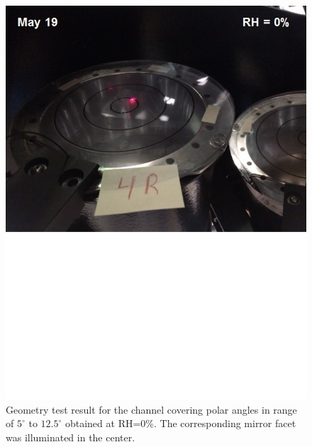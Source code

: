 \begin{figure}[ht]
    \centering
    \includegraphics[width=1.0\linewidth,trim={0 8.5cm 0 0},clip]{images/GEO_TEST_4_Zero.jpg}
    \caption{Geometry test result for the channel covering polar angles in range of $5^\circ$ to $12.5^\circ$ obtained at RH=0\%. The corresponding mirror facet was illuminated in the center.}
    \label{fig:GEO_TEST_4_Zero}
\end{figure}

